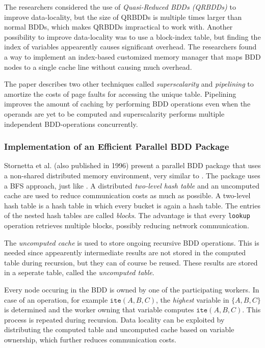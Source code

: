 The researchers considered the use of \emph{Quasi-Reduced BDDs (QRBDDs)} to improve data-locality, but the size of QRBDDs is multiple times larger than normal BDDs, which makes QRBDDs impractical to work with. Another possibility to improve data-locality was to use a block-index table, but finding the index of variables appearently causes significant overhead. The researchers found a way to implement an index-based customized memory manager that maps BDD nodes to a single cache line without causing much overhead.

The paper describes two other techniques called \emph{superscalarity} and \emph{pipelining} to amortize the costs of page faults for accessing the unique table. Pipelining improves the amount of caching by performing BDD operations even when the operands are yet to be computed and superscalarity performs multiple independent BDD-operations concurrently.

\subsubsection{Implementation of an Efficient Parallel BDD Package}
Stornetta et al. \cite{Stornetta96implementationof} (also published in 1996) present a parallel BDD package that uses a non-shared distributed memory environment, very similar to \cite{BDDNOW:parallel_bdd_package}. The package uses a BFS approach, just like \cite{545652}. A distributed \emph{two-level hash table} and an uncomputed cache are used to reduce communication costs as much as possible. A two-level hash table is a hash table in which every bucket is again a hash table. The entries of the nested hash tables are called \emph{blocks}. The advantage is that every \texttt{lookup} operation retrieves multiple blocks, possibly reducing network communication. 

The \emph{uncomputed cache} is used to store ongoing recursive BDD operations. This is needed since appearently intermediate results are not stored in the computed table during recursion, but they can of course be reused. These results are stored in a seperate table, called the \emph{uncomputed table}.

Every node occuring in the BDD is owned by one of the participating workers. In case of an operation, for example $\texttt{ite}(A,B,C)$, the \emph{highest} variable in $\{ A, B, C \}$ is determined and the worker owning that variable computes $\texttt{ite}(A,B,C)$. This process is repeated during recursion. Data locality can be exploited by distributing the computed table and uncomputed cache based on variable ownership, which further reduces communication costs.

